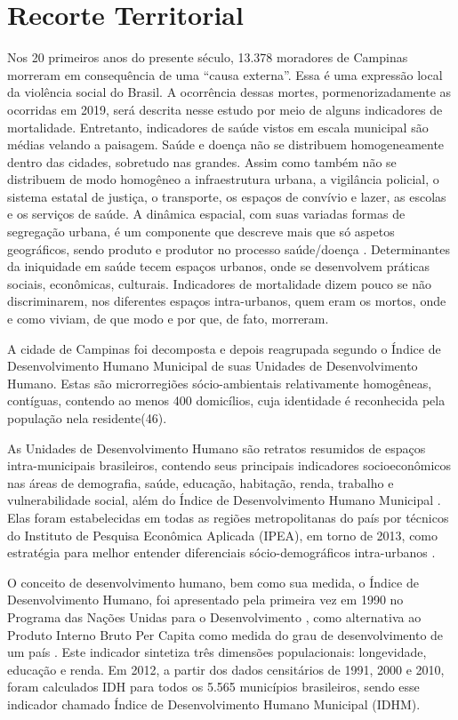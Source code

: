 \chapter{Recorte Territorial}

Nos 20 primeiros anos do presente século, 13.378 moradores de Campinas morreram em consequência de uma “causa externa”. Essa é uma expressão local da violência social do Brasil. A ocorrência dessas mortes, pormenorizadamente as ocorridas em 2019, será descrita nesse estudo por meio de alguns indicadores de mortalidade. Entretanto, indicadores de saúde vistos em escala municipal são médias velando a paisagem. Saúde e doença não se distribuem homogeneamente dentro das cidades, sobretudo nas grandes. Assim como também não se distribuem de modo homogêneo a infraestrutura urbana, a vigilância policial, o sistema estatal de justiça, o transporte, os espaços de convívio e lazer, as escolas e os serviços de saúde. A dinâmica espacial, com suas variadas formas de segregação urbana, é um componente que descreve mais que só aspetos geográficos, sendo produto e produtor no processo saúde/doença \citep{adorno1998violencias}. Determinantes da iniquidade em saúde tecem espaços urbanos, onde se desenvolvem práticas sociais, econômicas, culturais. Indicadores de mortalidade dizem pouco se não discriminarem, nos diferentes espaços intra-urbanos, quem eram os mortos, onde e como viviam, de que modo e por que, de fato, morreram.

A cidade de Campinas foi decomposta e depois reagrupada segundo o Índice de Desenvolvimento Humano Municipal de suas Unidades de Desenvolvimento Humano. Estas são microrregiões sócio-ambientais relativamente homogêneas, contíguas, contendo ao menos 400 domicílios, cuja identidade é reconhecida pela população nela residente(46).

As Unidades de Desenvolvimento Humano são retratos resumidos de espaços intra-municipais brasileiros, contendo seus principais indicadores socioeconômicos nas áreas de demografia, saúde, educação, habitação, renda, trabalho e vulnerabilidade social, além do Índice de Desenvolvimento Humano Municipal \citep{dos2016metodologia}. Elas foram estabelecidas em todas as regiões metropolitanas do país por técnicos do Instituto de Pesquisa Econômica Aplicada (IPEA), em torno de 2013, como estratégia para melhor entender diferenciais sócio-demográficos intra-urbanos \citep{costa2015atlas}.

O conceito de desenvolvimento humano, bem como sua medida, o Índice de Desenvolvimento Humano, foi apresentado pela primeira vez em 1990 no Programa das Nações Unidas para o Desenvolvimento \citep{UNO2020}, como alternativa ao Produto Interno Bruto Per Capita como medida do grau de desenvolvimento de um país \citep{pnud2015atlas}. Este indicador sintetiza três dimensões populacionais: longevidade, educação e renda. Em 2012, a partir dos dados censitários de 1991, 2000 e 2010, foram calculados IDH para todos os 5.565 municípios brasileiros, sendo esse indicador chamado Índice de Desenvolvimento Humano Municipal (IDHM).


